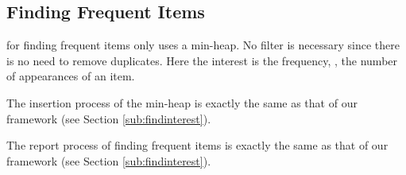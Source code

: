 \presub
\subsection{Finding Frequent Items} \postsub
\label{sub:findfreq}

\aname{} for finding frequent items only uses a min-heap. No filter is necessary since there is no need to remove duplicates. Here the interest is the frequency, \ie, the number of appearances of an item. 

{
\color{reviewD}
The insertion process of the min-heap is exactly the same as that of our framework (see Section \ref{sub:findinterest}).
}

{
\color{reviewD}
The report process of finding frequent items is exactly the same as that of our framework (see Section \ref{sub:findinterest}).
}
%
%


%
%
%
%
%

